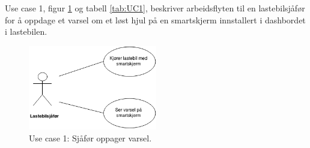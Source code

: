 Use case 1, figur \ref{fig:UC1} og tabell \ref{tab:UC1}, beskriver arbeidsflyten til en 
lastebilsjåfør for å oppdage et varsel om et løst hjul på en 
smartskjerm innstallert i dashbordet i lastebilen.
\newline
\begin{figure}[H]
	\centering
	\includegraphics[width=0.50\textwidth]{images/UC1.png}
	\caption{Use case 1: Sjåfør oppager varsel.}
	\label{fig:UC1}
\end{figure}

